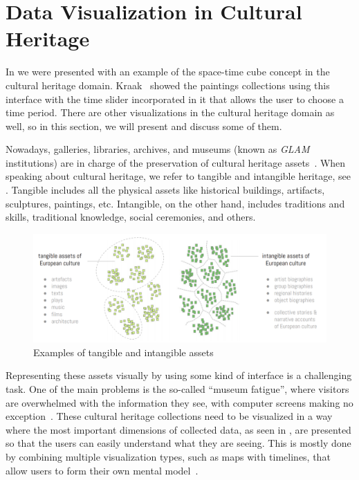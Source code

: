 \section{Data Visualization in Cultural Heritage}\label{sec:data-visualization-cultural-heritage}

In  we were presented with an example of the space-time cube concept in the cultural heritage domain.
Kraak~\citep{kraak2005timelines} showed the paintings collections using this interface with the time slider incorporated in it that allows the
user to choose a time period. There are other visualizations in the cultural heritage domain as well, so in this section, we will present and
discuss some of them.

Nowadays, galleries, libraries, archives, and museums (known as \emph{GLAM} institutions) are in charge of the preservation of cultural
heritage assets~\citep{windhager2018visualization}. When speaking about cultural heritage, we refer to tangible and intangible heritage,
see . Tangible includes all the physical assets like historical buildings, artifacts, sculptures, paintings, etc.
Intangible, on the other hand, includes traditions and skills, traditional knowledge, social ceremonies, and others.

\begin{figure}[hbt!]
    \begin{center}
        \includegraphics[width=\textwidth]{graphics/2-literature-review/17}
    \end{center}
    \caption{Examples of tangible and intangible assets~\citep{intavia}}
    \label{fig:figure2.17}
\end{figure}

Representing these assets visually by using some kind of interface is a challenging task. One of the main problems is the so-called “museum
fatigue”, where visitors are overwhelmed with the information they see, with computer screens making no exception~\citep{windhager2020many}.
These cultural heritage collections need to be visualized in a way where the most important dimensions of collected data, as seen in
, are presented so that the users can easily understand what they are seeing. This is mostly done by combining multiple
visualization types, such as maps with timelines, that allow users to form their own mental model~\citep{windhager2020many}.

